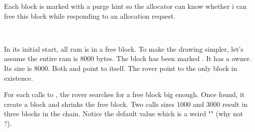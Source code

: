 Each block is marked with a purge hint so the allocator can know whether i can free this block while responding to an allocation request.\\
\par
{}\\
\par
In its initial start, all ram is in a free block. To make the drawing simpler, let's assume the entire ram is 8000 bytes. The block has been marked . It has a  owner. Its size is 8000. Both  and  point to itself. The rover point to the only block in existence.\\
\par
{}
\par
For each calls to , the rover searches for a free block big enough. Once found, it create a block and shrinks the free block. Two calls sizes 1000 and 3000 result in three blocks in the chain. Notice the default  value which is a weird "" (why not  ?).\\
\par
{}

